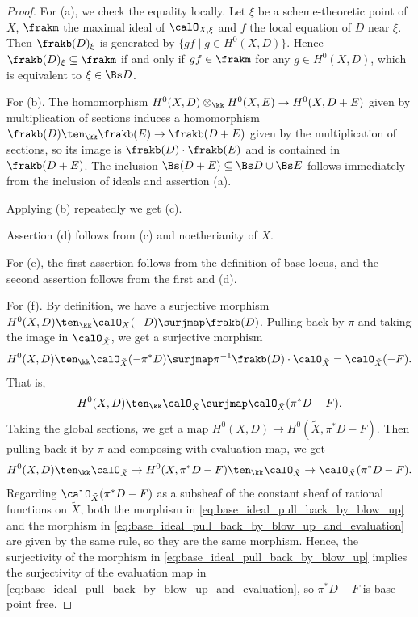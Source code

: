   \begin{proof}
    For (a), we check the equality locally.
    Let $\xi$ be a scheme-theoretic point of $X$, $\frakm$ the maximal ideal of $\calO_{X,\xi}$ and $f$ the local equation of $D$ near $\xi$.
    Then $\frakb(D)_\xi$ is generated by $\{gf \mid g \in H^0(X, D)\}$.
    Hence $\frakb(D)_\xi \subseteq \frakm$ if and only if $gf \in \frakm$ for any $g \in H^0(X, D)$, which is equivalent to $\xi \in \Bs D$.

    For (b). 
    The homomorphism $H^0(X, D) \otimes_\kk H^0(X, E) \to H^0(X, D+E)$ given by multiplication of sections induces a homomorphism $\frakb(D) \ten_\kk \frakb(E) \to \frakb(D+E)$ given by the multiplication of sections, so its image is $\frakb(D) \cdot \frakb(E)$ and is contained in $\frakb(D+E)$.
    The inclusion $\Bs(D+E) \subseteq \Bs D \cup \Bs E$ follows immediately from the inclusion of ideals and assertion (a).

    Applying (b) repeatedly we get (c).

    Assertion (d) follows from (c) and noetherianity of $X$.

    For (e), the first assertion follows from the definition of base locus, and the second assertion follows from the first and (d).
    
    For (f).
    By definition, we have a surjective morphism $H^0(X, D) \ten_\kk \calO_X(-D) \surjmap \frakb(D)$.
    Pulling back by $\pi$ and taking the image in $\calO_{\tilde{X}}$, we get a surjective morphism
    \[ H^0(X, D) \ten_\kk \calO_{\tilde{X}}(-\pi^* D) \surjmap \pi^{-1} \frakb(D) \cdot \calO_{\tilde{X}} = \calO_{\tilde{X}}(-F). \]
    That is, 
    \begin{equation}\label{eq:base_ideal_pull_back_by_blow_up}
      H^0(X, D) \ten_\kk \calO_{\tilde{X}} \surjmap \calO_{\tilde{X}}(\pi^* D-F).
    \end{equation}
    Taking the global sections, we get a map $H^0(X, D) \to H^0(\tilde{X}, \pi^* D-F)$.
    Then pulling back it by $\pi$ and composing with evaluation map, we get
    \begin{equation}\label{eq:base_ideal_pull_back_by_blow_up_and_evaluation}
      H^0(X, D) \ten_\kk \calO_{\tilde{X}} \to H^0(X, \pi^* D-F) \ten_\kk \calO_{\tilde{X}} \to \calO_{\tilde{X}}(\pi^* D-F).
    \end{equation}
    Regarding $\calO_{\tilde{X}}(\pi^* D-F)$ as a subsheaf of the constant sheaf of rational functions on $\tilde{X}$, both the morphism in \cref{eq:base_ideal_pull_back_by_blow_up} and the morphism in \cref{eq:base_ideal_pull_back_by_blow_up_and_evaluation} are given by the same rule, so they are the same morphism.
    Hence, the surjectivity of the morphism in \cref{eq:base_ideal_pull_back_by_blow_up} implies the surjectivity of the evaluation map in \cref{eq:base_ideal_pull_back_by_blow_up_and_evaluation}, so $\pi^* D - F$ is base point free.
  \end{proof}

